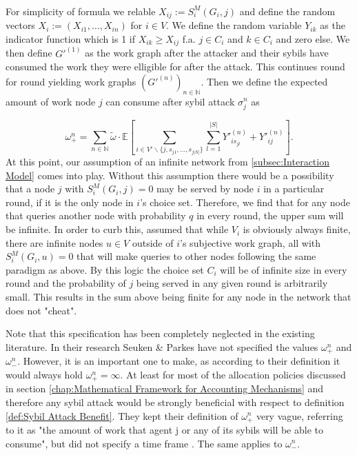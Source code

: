  
\begin{definition}\ \\
\label{def:Sybil Attack Profit}
\noindent{}For simplicity of formula we relable $X_{ij}:=S^M_i(G_i,j)$ and define the random vectors $X_i:=(X_{i1},\ldots,X_{in})$ for $i\in{}V$. We define the random variable $Y_{ik}$ as the indicator function which is 1 if $X_{ik}\geq{}X_{ij}$ f.a. $j\in{}C_i$ and $k\in{}C_i$ and zero else. We then define $G'^{(1)}$ as the work graph after the attacker and their sybils have consumed the work they were elligible for after the attack. This continues round for round yielding work graphs $\left(G'^{(n)}\right)_{n\in\mathbb{N}}$. Then we define the expected amount of work node $j$ can consume after sybil attack $\sigma_j^n$ as 

\[
\omega_{+}^{n} = \sum\limits_{n\in\mathbb{N}}\tilde{\omega}\cdot\mathbb{E}\left[\sum\limits_{i\in{}V'\backslash\lbrace{}j,s_{j1},\ldots,s_{j|S|}\rbrace}\sum\limits_{l=1}^{|S|}Y'^{(n)}_{is_{jl}} + Y'^{(n)}_{ij}\right].
\]
\noindent{}At this point, our assumption of an infinite network from \ref{subsec:Interaction Model} comes into play. Without this assumption there would be a possibility that a node $j$ with $S^M_i(G_i,j)=0$ may be served by node $i$ in a particular round, if it is the only node in $i$'s choice set. Therefore, we find that for any node that queries another node with probability $q$ in every round, the upper sum will be infinite. In order to curb this, assumed that while $V_i$ is obviously always finite, there are infinite nodes $u\in{}V$ outside of $i$'s subjective work graph, all with $S^M_i(G_i,u)=0$ that will make queries to other nodes following the same paradigm as above. By this logic the choice set $C_i$ will be of infinite size in every round and the probability of $j$ being served in any given round is arbitrarily small. This results in the sum above being finite for any node in the network that does not "cheat".
\end{definition}

\noindent{}Note that this specification has been completely neglected in the existing literature. In their research Seuken \& Parkes have not specified the values $\omega_{+}^{n}$ and $\omega_{-}^{n}$. However, it is an important one to make, as according to their definition it would always hold $\omega_{+}^n=\infty$. At least for most of the allocation policies discussed in section \ref{chap:Mathematical Framework for Accounting Mechanisms} and therefore any sybil attack would be strongly beneficial with respect to definition \ref{def:Sybil Attack Benefit}. They kept their definition of $\omega_{+}^n$ very vague, referring to it as "the amount of work that agent j or any
of its sybils will be able to consume", but did not specify a time frame \cite{On the Sybil-Proofness of Accounting Mechanisms}. The same applies to $\omega_{-}^n$.\vspace{1em}\\

